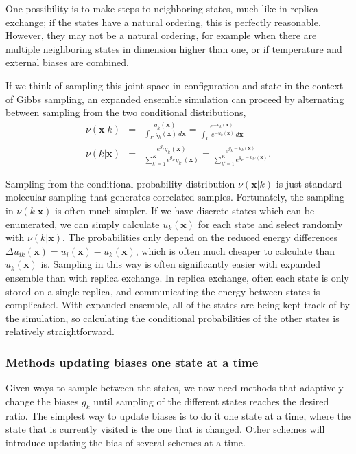\documentclass[9pt,review]{livecoms}
\newcommand{\vx}{\mathbf{x}}
\begin{document}
One possibility is to make steps to neighboring states, much like in replica exchange; if the states have a natural ordering, this is perfectly reasonable. However, they may not be a natural ordering, for example when there are multiple neighboring states in dimension higher than one, or if temperature and external biases are combined.

If we think of sampling this joint space in configuration and state in the context of Gibbs sampling, an \hyperlink{ref:ExpEns} {expanded ensemble} simulation can proceed by alternating between sampling from the two conditional distributions,
\begin{eqnarray}
\nu(\vx | k) &=& \frac{q_k(\vx)}{\int_\Gamma  \, q_k(\vx) \, d\vx}  = \frac{e^{-u_k(\vx)}}{\int_\Gamma  \, e^{-u_k(\vx)} \, d\vx }  \\
\nu(k | \vx) &=& \frac{e^{g_k}q_k(\vx)}{\sum\limits_{k'=1}^K e^{g_{k'}}q_{k'}(\vx)} = \frac{e^{g_k - u_k(\vx)}}{\sum\limits_{k'=1}^K e^{g_{k'} - u_{k'}(\vx)}} .\label{equation:expanded-ensemble-gibbs-update}
\end{eqnarray}

Sampling from the conditional probability distribution
$\nu(\vx | k)$ is just standard molecular sampling that generates correlated samples. Fortunately, the sampling in $\nu(k | \vx)$ is often much simpler.   If we have
discrete states which can be enumerated, we can simply calculate
$u_k(\vx)$ for each state and select randomly with $\nu(k|\vx)$.  The
probabilities only depend on the \hyperlink{ref:reduced} {reduced} energy differences $\Delta
u_{ik}(\vx) = u_i(\vx) - u_k(\vx)$, which is often much cheaper to calculate
than $u_k(\vx)$ is. Sampling in this way is often significantly easier with expanded ensemble than with replica exchange. In replica exchange, often each state is only stored on a single replica, and communicating the energy between states is complicated. With expanded ensemble, all of the states are being kept track of by the simulation, so calculating the conditional probabilities of the other states is relatively straightforward.

\subsubsection{\label{sec:singlestate} Methods updating biases one state at a time}
Given ways to sample between the states, we now need methods that adaptively change the biases $g_k$ until sampling of the different states reaches the desired ratio. The simplest way to update biases is to do it one state at a time, where the state that is currently visited is the one that is changed. Other schemes will introduce updating the bias of several schemes at a time.
\end{document}
